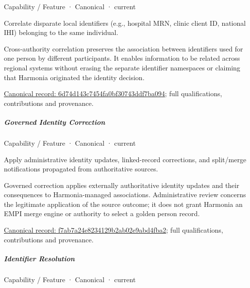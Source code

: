 
\label{element:6d74d143c7454fa0bf30743ddf7ba094}
{\small Capability / Feature · Canonical · current}\par

Correlate disparate local identifiers (e.g., hospital MRN, clinic client ID, national IHI) belonging to the same individual.



Cross-authority correlation preserves the association between identifiers used for one person by different participants. It enables information to be related across regional systems without erasing the separate identifier namespaces or claiming that Harmonia originated the identity decision.


{\footnotesize \href{../../../../continuum/strategy/capability/feature/6d74d143c7454fa0bf30743ddf7ba094.md}{Canonical record: 6d74d143c7454fa0bf30743ddf7ba094}; full qualifications, contributions and provenance.}\par
\subparagraph{Governed Identity Correction}


\label{element:f7ab7a24e8234129b2ab02e9abd4fba2}
{\small Capability / Feature · Canonical · current}\par

Apply administrative identity updates, linked-record corrections, and split/merge notifications propagated from authoritative sources.



Governed correction applies externally authoritative identity updates and their consequences to Harmonia-managed associations. Administrative review concerns the legitimate application of the source outcome; it does not grant Harmonia an EMPI merge engine or authority to select a golden person record.


{\footnotesize \href{../../../../continuum/strategy/capability/feature/f7ab7a24e8234129b2ab02e9abd4fba2.md}{Canonical record: f7ab7a24e8234129b2ab02e9abd4fba2}; full qualifications, contributions and provenance.}\par
\subparagraph{Identifier Resolution}


\label{element:ae034169e1394ccdb3a2ce9651eaf305}
{\small Capability / Feature · Canonical · current}\par

